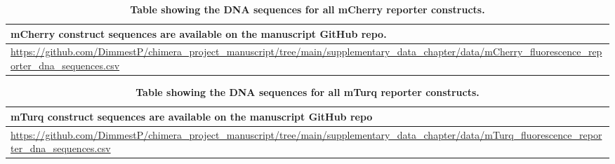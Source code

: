 \documentclass[../main.tex]{subfiles}
\begin{document}
\begin{table}[ph!]
\def\arraystretch{1.25}
\centering
\setlength{\tabcolsep}{5pt}\fontsize{9}{9}\selectfont
\begin{tabular}[t]{>{\centering\arraybackslash}p{30em}}
\hline
mCherry construct sequences are available on the manuscript GitHub repo.\\
\hline
\url{https://github.com/DimmestP/chimera_project_manuscript/tree/main/supplementary_data_chapter/data/mCherry_fluorescence_reporter_dna_sequences.csv}\\
\hline
\end{tabular}
\caption[Table showing the DNA sequences for all mCherry reporter constructs.]{\label{tab:mCherry-seq}\textbf{Table showing the DNA sequences for all mCherry reporter constructs.}}
\end{table}

\begin{table}[ph!]
\def\arraystretch{1.25}
\centering
\setlength{\tabcolsep}{5pt}\fontsize{9}{9}\selectfont
\begin{tabular}[t]{>{\centering\arraybackslash}p{30em}}
\hline
mTurq construct sequences are available on the manuscript GitHub repo\\
\hline
\url{https://github.com/DimmestP/chimera_project_manuscript/tree/main/supplementary_data_chapter/data/mTurq_fluorescence_reporter_dna_sequences.csv}\\
\hline
\end{tabular}
\caption[Table showing the DNA sequences for all mTurq reporter constructs.]{\label{tab:mTurq-seq}\textbf{Table showing the DNA sequences for all mTurq reporter constructs.}}
\end{table}

\end{document}
